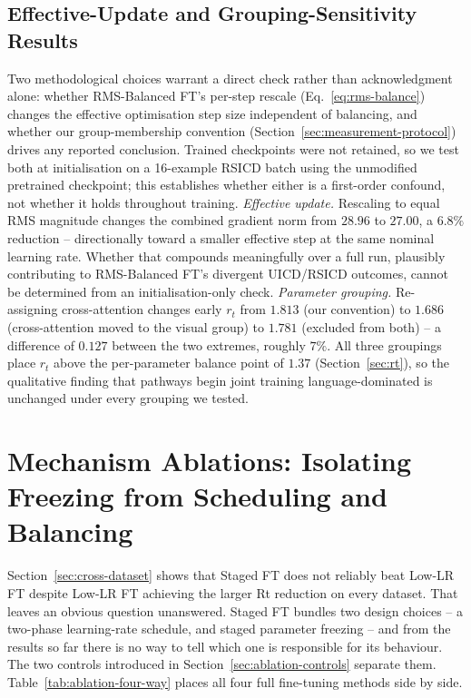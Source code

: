 \documentclass[journal]{IEEEtran}
\begin{document}
\subsection{Effective-Update and Grouping-Sensitivity Results}
\label{sec:sensitivity-results}

Two methodological choices warrant a direct check rather than
acknowledgment alone: whether RMS-Balanced FT's per-step rescale
(Eq.~\ref{eq:rms-balance}) changes the effective optimisation step
size independent of balancing, and whether our group-membership
convention (Section~\ref{sec:measurement-protocol}) drives any
reported conclusion. Trained checkpoints were not retained, so we
test both at initialisation on a 16-example RSICD batch using the
unmodified pretrained checkpoint; this establishes whether either is
a first-order confound, not whether it holds throughout training.
\emph{Effective update.} Rescaling to equal RMS magnitude changes the
combined gradient norm from $28.96$ to $27.00$, a $6.8\%$ reduction --
directionally toward a smaller effective step at the same nominal
learning rate. Whether that compounds meaningfully over a full run,
plausibly contributing to RMS-Balanced FT's divergent UICD/RSICD
outcomes, cannot be determined from an initialisation-only check.
\emph{Parameter grouping.} Re-assigning cross-attention changes early
$r_t$ from $1.813$ (our convention) to $1.686$ (cross-attention moved
to the visual group) to $1.781$ (excluded from both) -- a difference
of $0.127$ between the two extremes, roughly $7\%$. All three groupings place $r_t$ above the per-parameter balance point of
$1.37$ (Section~\ref{sec:rt}), so the qualitative finding that
pathways begin joint training language-dominated is unchanged under every grouping we tested.

\section{Mechanism Ablations: Isolating Freezing from Scheduling and Balancing}
\label{sec:ablations}

Section~\ref{sec:cross-dataset} shows that Staged FT does not
reliably beat Low-LR FT despite Low-LR FT achieving the larger Rt reduction on every dataset. That leaves an obvious question unanswered. Staged FT bundles two design choices -- a two-phase
learning-rate schedule, and staged parameter freezing -- and
from the results so far there is no way to tell which one is
responsible for its behaviour. The two controls introduced in
Section~\ref{sec:ablation-controls} separate them.
Table~\ref{tab:ablation-four-way} places all four full
fine-tuning methods side by side.
\end{document}
